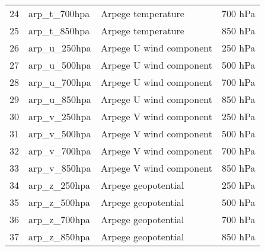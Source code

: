 \begin{table}[h]
\begin{tabular}{llll}
24 & arp\_t\_700hpa     & Arpege temperature & 700 hPa \\
25 & arp\_t\_850hpa     & Arpege temperature & 850 hPa \\
26 & arp\_u\_250hpa     & Arpege U wind component & 250 hPa \\
27 & arp\_u\_500hpa     & Arpege U wind component & 500 hPa \\
28 & arp\_u\_700hpa     & Arpege U wind component & 700 hPa \\
29 & arp\_u\_850hpa     & Arpege U wind component & 850 hPa \\
30 & arp\_v\_250hpa     & Arpege V wind component & 250 hPa \\
31 & arp\_v\_500hpa     & Arpege V wind component & 500 hPa \\
32 & arp\_v\_700hpa     & Arpege V wind component & 700 hPa \\
33 & arp\_v\_850hpa     & Arpege V wind component & 850 hPa \\
34 & arp\_z\_250hpa     & Arpege geopotential & 250 hPa \\
35 & arp\_z\_500hpa     & Arpege geopotential & 500 hPa \\
36 & arp\_z\_700hpa     & Arpege geopotential & 700 hPa \\
37 & arp\_z\_850hpa     & Arpege geopotential & 850 hPa \\
\hline
\end{tabular}
\end{table}